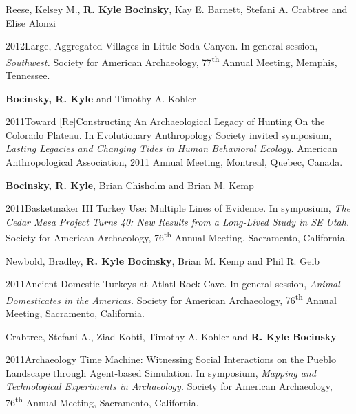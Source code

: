 Reese, Kelsey M., {\bf R. Kyle Bocinsky}, Kay E. Barnett, Stefani A. Crabtree and Elise Alonzi
\nopagebreak
\begin{list1}
\item[] 2012\hspace{.2cm}Large, Aggregated Villages in Little Soda Canyon. In general session, \emph{Southwest.} Society for American Archaeology, 77\textsuperscript{th} Annual Meeting, Memphis, Tennessee. %
\end{list1}


{\bf Bocinsky, R. Kyle} and Timothy A. Kohler
\nopagebreak
\begin{list1}
\item[] 2011\hspace{.2cm}Toward [Re]Constructing An Archaeological Legacy of Hunting On the Colorado Plateau. In Evolutionary Anthropology Society invited symposium, \emph{Lasting Legacies and Changing Tides in Human Behavioral Ecology.} American Anthropological Association, 2011 Annual Meeting, Montreal, Quebec, Canada.
\end{list1}


{\bf Bocinsky, R. Kyle}, Brian Chisholm and Brian M. Kemp
\nopagebreak
\begin{list1}
\item[] 2011\hspace{.2cm}Basketmaker III Turkey Use: Multiple Lines of Evidence. In symposium, \emph{The Cedar Mesa Project Turns 40: New Results from a Long-Lived Study in SE Utah.} Society for American Archaeology, 76\textsuperscript{th} Annual Meeting, Sacramento, California.
\end{list1}


Newbold, Bradley, {\bf R. Kyle Bocinsky}, Brian M. Kemp and Phil R. Geib
\nopagebreak
\begin{list1}
\item[] 2011\hspace{.2cm}Ancient Domestic Turkeys at Atlatl Rock Cave. In general session, \emph{Animal Domesticates in the Americas.} Society for American Archaeology, 76\textsuperscript{th} Annual Meeting, Sacramento, California.
\end{list1}


Crabtree, Stefani A., Ziad Kobti, Timothy A. Kohler and {\bf R. Kyle Bocinsky}
\nopagebreak
\begin{list1}
\item[] 2011\hspace{.2cm}Archaeology Time Machine: Witnessing Social Interactions on the Pueblo Landscape through Agent-based Simulation. In symposium, \emph{Mapping and Technological Experiments in Archaeology.} Society for American Archaeology, 76\textsuperscript{th} Annual Meeting, Sacramento, California.
\end{list1}


